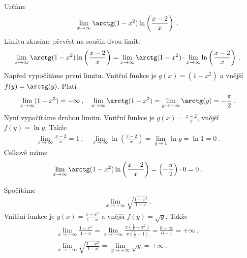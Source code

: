\begin{example}
    Určíme
    \begin{align}
        \lim_{x \rightarrow \infty} \arctg (1-x^2) \ln \left( \frac{x-2}{x} \right) \:.
    \end{align}
    Limitu zkusíme převést na součin dvou limit:
    \begin{align}
        \lim_{x \rightarrow \infty} \arctg (1-x^2) \ln \left( \frac{x-2}{x} \right) = \lim_{x \rightarrow \infty} \arctg (1-x^2)  \cdot \lim_{x \rightarrow \infty} \ln \left( \frac{x-2}{x} \right) \:.
    \end{align}
    Napřed vypočítáme první limitu. Vnitřní funkce je $g(x) = (1-x^2)$ a vnější $f(y) = \arctg (y)$. Platí
    \begin{align}
        \lim_{x \rightarrow \infty} (1-x^2) = - \infty \:, \quad \lim_{x \rightarrow \infty} \arctg (1-x^2) = \lim_{y \rightarrow - \infty} \arctg (y) = - \frac{\pi}{2} \:.
    \end{align}
    Nyní vypočítáme druhou limitu. Vnitřní funkce je $g(x) = \frac{x-2}{x}$, vnější $f(y) = \ln y$. Takže
    \begin{align}
        \lim_{x \rightarrow \infty} \frac{x-2}{x} = 1 \:, \quad \lim_{x \rightarrow \infty} \ln \left( \frac{x-2}{x} \right) = \lim_{y \rightarrow 1} \ln y = \ln 1 = 0 \:.
    \end{align}
    Celkově máme
    \begin{align}
        \lim_{x \rightarrow \infty} \arctg (1-x^2) \ln \left( \frac{x-2}{x} \right) = \left( - \frac{\pi}{2} \right) \cdot 0 = 0 \:.
    \end{align}
\end{example}

\begin{example}
    Spočítáme
    \begin{align}
        \lim_{x \rightarrow - \infty} \sqrt{\frac{1-x^3}{1-x}} \:.
    \end{align}
    Vnitřní funkce je $g(x) = \frac{1-x^3}{1-x}$ a vnější $f(y) = \sqrt{y}$. Takže
    \begin{align}
        \lim_{x \rightarrow - \infty} \frac{1-x^3}{1-x} =
        \lim_{x \rightarrow - \infty} \frac{x(\frac{1}{x} - x^2)}{x(\frac{1}{x}-1)} = 
        \frac{0-\infty}{0-1} = + \infty \:, \\
        \lim_{x \rightarrow - \infty} \sqrt{\frac{1-x^3}{1-x}} = \lim_{y \rightarrow + \infty} \sqrt{y} = + \infty \:.
    \end{align}
\end{example}

